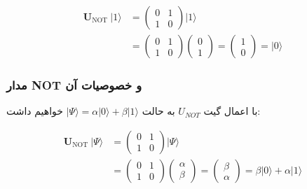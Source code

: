 \documentclass{book}
\begin{document}
$$
\begin{aligned}
	\boldsymbol{U}_{\text {NOT }}|1\rangle & =\left(\begin{array}{ll}
		0 & 1 \\
		1 & 0
	\end{array}\right)|1\rangle \\
	& =\left(\begin{array}{ll}
		0 & 1 \\
		1 & 0
	\end{array}\right)\left(\begin{array}{l}
		0 \\
		1
	\end{array}\right)=\left(\begin{array}{l}
		1 \\
		0
	\end{array}\right)=|0\rangle
\end{aligned}
$$

\subsubsection{مدار NOT و خصوصیات آن}
با اعمال گیت $U_{NOT}$ به حالت $\vert \Psi \rangle = \alpha \vert 0 \rangle + \beta \vert 1\rangle$ خواهیم داشت:
 
\begin{center}
$$	\begin{aligned}
		\boldsymbol{U}_{\text {NOT }}|\Psi\rangle & =\left(\begin{array}{ll}
			0 & 1 \\
			1 & 0
		\end{array}\right)|\Psi\rangle \\
		& =\left(\begin{array}{ll}
			0 & 1 \\
			1 & 0
		\end{array}\right)\left(\begin{array}{l}
			\alpha \\
			\beta
		\end{array}\right)=\left(\begin{array}{l}
			\beta \\
			\alpha
		\end{array}\right)=\beta|0\rangle+\alpha|1\rangle
	\end{aligned}$$
\end{center}
\end{document}
